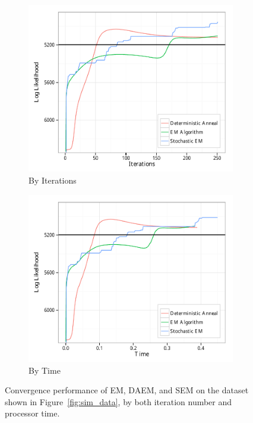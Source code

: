 \documentclass{article}
\theoremstyle{definition}
\theoremstyle{algodesc}
\begin{document}
\begin{figure}[htb] \centering
  \begin{subfigure}[t]{.45\linewidth}
    \includegraphics[width=\linewidth]{include/results_byiter.pdf}
    \caption{By Iterations} \label{fig:algcomps_byiter}
  \end{subfigure}
  \begin{subfigure}[t]{.45\linewidth}
    \includegraphics[width=\linewidth]{include/results_bytime.pdf}
    \caption{By Time} \label{fig:algcomps_bytime}
  \end{subfigure}
  \caption{Convergence performance of EM, DAEM, and SEM on the dataset shown in Figure~\ref{fig:sim_data}, by both iteration number and processor time.}
  \label{fig:algcomps}
\end{figure}
\end{document}
